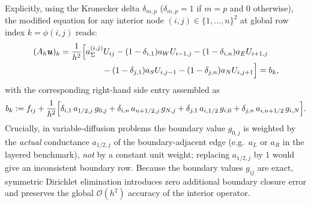 \documentclass[11pt,a4paper]{article}
\theoremstyle{definition}
\theoremstyle{remark}
\begin{document}
Explicitly, using the Kronecker delta $\delta_{m,p}$ ($\delta_{m,p}=1$ if $m=p$ and $0$ otherwise), the modified equation for any interior node $(i,j) \in \{1,\dots,n\}^2$ at global row index $k = \phi(i,j)$ reads:
\begin{align}
    (A_h \bm{u})_k &= \frac{1}{h^2}\Bigl[ a_\Sigma^{(i,j)} U_{ij} - (1-\delta_{i,1})a_W U_{i-1,j} - (1-\delta_{i,n})a_E U_{i+1,j} \nonumber \\
    &\qquad\qquad\quad - (1-\delta_{j,1})a_S U_{i,j-1} - (1-\delta_{j,n})a_N U_{i,j+1} \Bigr] = b_k,
    \label{eq:lhs_boundary_elim}
\end{align}
with the corresponding right-hand side entry assembled as
\begin{equation}
    b_k := f_{ij} + \frac{1}{h^2}\Bigl[ \delta_{i,1}\, a_{1/2,j}\, g_{0,j} + \delta_{i,n}\, a_{n+1/2,j}\, g_{N,j} + \delta_{j,1}\, a_{i,1/2}\, g_{i,0} + \delta_{j,n}\, a_{i,n+1/2}\, g_{i,N} \Bigr].
    \label{eq:rhs_boundary_elim}
\end{equation}
Crucially, in variable-diffusion problems the boundary value $g_{0,j}$ is weighted by the \emph{actual} conductance $a_{1/2,j}$ of the boundary-adjacent edge (e.g.\ $a_L$ or $a_R$ in the layered benchmark), \emph{not} by a constant unit weight; replacing $a_{1/2,j}$ by $1$ would give an inconsistent boundary row. Because the boundary values $g_{ij}$ are exact, symmetric Dirichlet elimination introduces zero additional boundary closure error and preserves the global $\mathcal{O}(h^2)$ accuracy of the interior operator.
\end{document}
